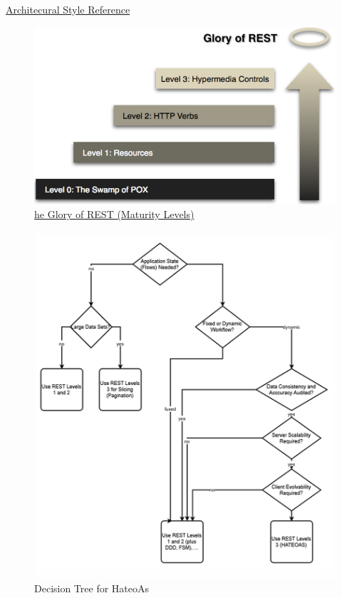 \documentclass[../Main.tex]{subfiles}
\begin{document}
\href{http://www.ics.uci.edu/~fielding/pubs/dissertation/rest_arch_style.htm}{Architecural Style Reference}

\begin{figure}[H]
    \centering
    \includegraphics[width=0.4\linewidth]{Images/glory-of-rest.png}
    \caption{\href{https://martinfowler.com/articles/richardsonMaturityModel.htmlT}{he Glory of REST (Maturity Levels)}}
\end{figure}

\newpage
\begin{figure}[H]
    \centering
    \includegraphics[width=0.75\linewidth]{Images/hate-oas-dectree.png}
    \caption{Decision Tree for HateoAs}
\end{figure}
\newpage
\end{document}

